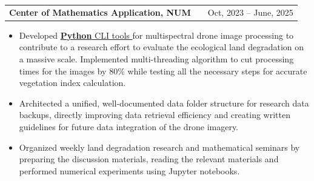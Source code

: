 \documentclass[a4paper,11pt]{article}
\makeatletter
\newcommand{\linkicon}{{\footnotesize\faExternalLink*}}
\newenvironment{jobshort}[2]
    {
    \begin{tabularx}{\linewidth}{@{}l X r@{}}
    \textbf{#1} & \hfill &  #2 \\[3.75pt]
    \end{tabularx}
    }
    {
    }
\makeatother
\begin{document}
\begin{jobshort}{Center of Mathematics Application, NUM}{Oct, 2023 -- June, 2025}
\begin{itemize}[nosep,after=\strut,leftmargin=1em,itemsep=3pt,label=--]
    \item Developed \href{https://github.com/MendeBadra/BelceeriinDoroitol}{\textbf{Python} CLI tools \linkicon} for multispectral drone image processing to contribute to a research effort to evaluate the ecological land degradation on a massive scale. Implemented multi-threading algorithm to cut processing times for the images by 80\% while testing all the necessary steps for accurate vegetation index calculation.
  
    
    \item Architected a unified, well-documented data folder structure for research data backups, directly improving data retrieval efficiency and creating written guidelines for future data integration of the drone imagery.
    
    
    \item Organized weekly land degradation research and mathematical seminars by preparing the discussion materials, reading the relevant materials and performed numerical experiments using Jupyter notebooks.
    
  

    
   

\end{itemize}
\end{jobshort}
\end{document}

